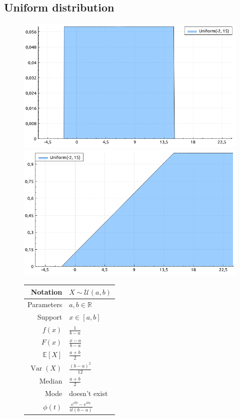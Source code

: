 \documentclass[a4paper,11pt]{article}
\theoremstyle{plain}
\theoremstyle{definition}
\newcommand{\ME}{\mathbb{E}}
\newcommand{\MR}{\mathbb{R}}
\newcommand{\Var}{\operatorname{Var}}
\begin{document}
	\subsection{Uniform distribution}
	\begin{figure}[!htb]\centering
		\begin{minipage}{0.55\textwidth}
			\includegraphics[width=\linewidth, right]{uniform_pdf}
			\captionsetup{labelformat=empty}
			\includegraphics[width=\linewidth, right]{uniform_cdf}
			\captionsetup{labelformat=empty}
		\end{minipage}
		\begin{minipage}{0.4\textwidth}
			\begin{tabular}{| r | l |}
				\hline
				Notation & $ X \sim \mathcal{U}(a, b)$ \\
				\hline
				Parameters & $a, b \in \MR$ \\
				\hline
				Support & $x \in [a, b]$  \\
				\hline
				$f(x)$ & $\frac{1}{b - a}$ \\
				\hline
				$F(x)$ & $\frac{x - a}{b - a}$\\
				\hline
				$\ME[X]$ & $ \frac{a+b}{2}$ \\
				\hline
				$\Var(X)$ & $\frac{(b-a)^2}{12}$ \\
				\hline
				Median & $\frac{a+b}{2}$ \\
				\hline
				Mode & doesn't exist \\
				\hline
				$\phi(t)$ & $ \frac{e^{itb}-e^{ita}}{it(b-a)} $ \\
				\hline
			\end{tabular}
		\end{minipage}
	\end{figure}
	
\end{document}
